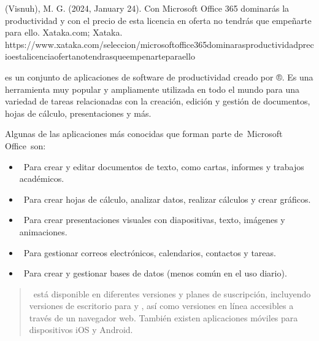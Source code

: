 \documentclass[letterpaper,10pt,spanish]{sphinxmanual}
\begin{document}
\sphinxAtStartPar
%
\begin{footnote}[3]\sphinxAtStartFootnote
(Visnuh), M. G. (2024, January 24). Con Microsoft Office 365 dominarás la productividad y con el precio de esta licencia en oferta no tendrás que empeñarte para ello. Xataka.com; Xataka. https://www.xataka.com/seleccion/microsoft\sphinxhyphen{}office\sphinxhyphen{}365\sphinxhyphen{}dominaras\sphinxhyphen{}productividad\sphinxhyphen{}precio\sphinxhyphen{}esta\sphinxhyphen{}licencia\sphinxhyphen{}oferta\sphinxhyphen{}no\sphinxhyphen{}tendras\sphinxhyphen{}que\sphinxhyphen{}empenarte\sphinxhyphen{}para\sphinxhyphen{}ello
%
\end{footnote}  es un conjunto de aplicaciones de software de productividad creado por ®. Es una herramienta muy popular y ampliamente utilizada en todo el mundo para una variedad de tareas relacionadas con la creación, edición y gestión de documentos, hojas de cálculo, presentaciones y más.

\sphinxAtStartPar
Algunas de las aplicaciones más conocidas que forman parte de Microsoft Office son:
\begin{itemize}
\item {} 
\sphinxAtStartPar
{} Para crear y editar documentos de texto, como cartas, informes y trabajos académicos.

\item {} 
\sphinxAtStartPar
{} Para crear hojas de cálculo, analizar datos, realizar cálculos y crear gráficos.

\item {} 
\sphinxAtStartPar
{} Para crear presentaciones visuales con diapositivas, texto, imágenes y animaciones.

\item {} 
\sphinxAtStartPar
{} Para gestionar correos electrónicos, calendarios, contactos y tareas.

\item {} 
\sphinxAtStartPar
{} Para crear y gestionar bases de datos (menos común en el uso diario).

\end{itemize}
\begin{quote}

\sphinxAtStartPar
{} está disponible en diferentes versiones y planes de suscripción, incluyendo versiones de escritorio para  y , así como versiones en línea accesibles a través de un navegador web. También existen aplicaciones móviles para dispositivos iOS y Android.
\end{quote}
\end{document}
